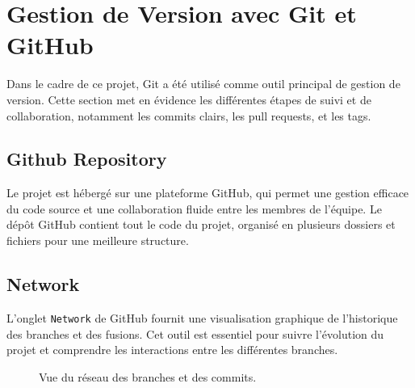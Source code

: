 \chapter{Gestion de Version avec Git et GitHub}

Dans le cadre de ce projet, Git a été utilisé comme outil principal de gestion de version. Cette section met en évidence les différentes étapes de suivi et de collaboration, notamment les commits clairs, les pull requests, et les tags.

\section{Github Repository}
Le projet est hébergé sur une plateforme GitHub, qui permet une gestion efficace du code source et une collaboration fluide entre les membres de l’équipe. Le dépôt GitHub contient tout le code du projet, organisé en plusieurs dossiers et fichiers pour une meilleure structure.

\section{Network}
L’onglet \texttt{Network} de GitHub fournit une visualisation graphique de l’historique des branches et des fusions. Cet outil est essentiel pour suivre l’évolution du projet et comprendre les interactions entre les différentes branches.

\begin{figure}[H]
    \centering
    \caption{Vue du réseau des branches et des commits.}
    \label{fig:network}
\end{figure}
